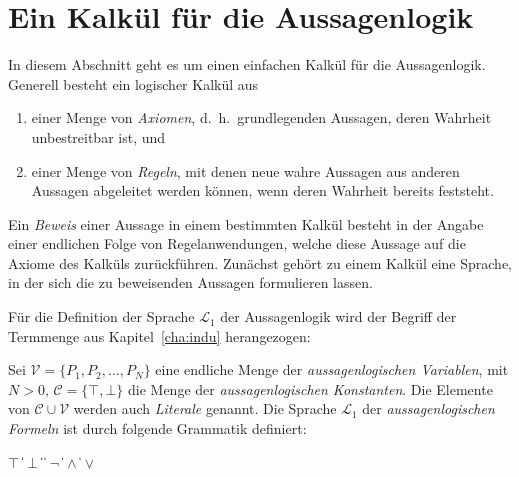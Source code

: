 \section{Ein Kalkül für die Aussagenlogik}
\label{sec:calculus-logic}

In diesem Abschnitt geht es um einen einfachen Kalkül für die
Aussagenlogik.  Generell besteht ein logischer Kalkül aus
\begin{enumerate}
\item einer Menge von \emph{Axiomen}, d.~h.\ grundlegenden 
  Aussagen, deren Wahrheit unbestreitbar ist, und
\item einer Menge von \textit{Regeln},  mit denen neue wahre
  Aussagen aus anderen Aussagen abgeleitet werden können, wenn deren Wahrheit
  bereits feststeht.
\end{enumerate}
%
Ein \emph{Beweis} einer Aussage in einem bestimmten Kalkül besteht in der
Angabe einer endlichen Folge von Regelanwendungen, welche diese Aussage auf die
Axiome des Kalküls zurückführen.  Zunächst gehört zu einem Kalkül
 eine Sprache, in der sich die zu beweisenden Aussagen
formulieren lassen.

Für die Definition der Sprache $\mathcal{L}_1$ der Aussagenlogik
wird der Begriff der Termmenge aus Kapitel~\ref{cha:indu} herangezogen:
%
\begin{definition} Sei $\mathcal{V}=\{P_1,P_2,\ldots,
  P_N\}$ eine endliche Menge der \textit{aussagenlogischen
    Variablen}, mit $N>0$, $\mathcal{C} = \{ \top, \bot \}$ die Menge der
  \textit{aussagenlogischen
    Konstanten}.  Die Elemente von
  $\mathcal{C}\cup\mathcal{V}$ werden auch \emph{Literale} genannt.
    Die Sprache
  $\mathcal{L}_1$ der
  \textit{aussagenlogischen
    Formeln} ist durch folgende Grammatik definiert:
  \begin{grammar}
     \: $\top$ \| $\bot$
    \> \|  \| $\neg$ 
    \> \|  $\wedge$ 
    \> \|  $\vee$ 
  \end{grammar}

\end{definition}
%

